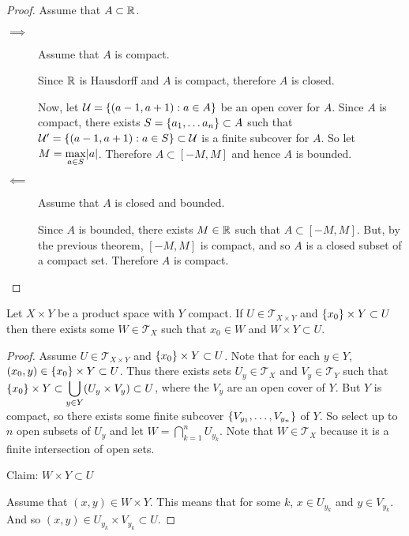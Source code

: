 \documentclass[letterpaper,12pt,fleqn]{article}
\newcommand{\T}{\mathscr{T}}
\newcommand{\U}{\mathcal{U}}
\begin{document}
\begin{proof}
  Assume that \(A\subset\mathbb{R}\).
  \begin{description}
  \item[\(\implies\)] Assume that \(A\) is compact.

    Since \(\mathbb{R}\) is Hausdorff and \(A\) is compact, therefore \(A\) is closed.

    Now, let \(\U=\set{(a-1,a+1):a\in A}\) be an open cover for \(A\).  Since \(A\) is compact, there exists
    \(S=\{a_1,\ldots a_n\}\subset A\) such that \(\U'=\set{(a-1,a+1):a\in S}\subset\U\) is a finite subcover for
    \(A\).  So let \(\displaystyle M=\max_{a\in S}\lvert a\rvert\).  Therefore \(A\subset[-M,M]\) and hence \(A\) is bounded.

  \item[\(\impliedby\)] Assume that \(A\) is closed and bounded.

    Since \(A\) is bounded, there exists \(M\in\mathbb{R}\) such that \(A\subset[-M,M]\).  But, by the previous theorem,
    \([-M,M]\) is compact, and so \(A\) is a closed subset of a compact set.  Therefore \(A\) is compact.
  \end{description}
\end{proof}

\begin{theorem}
  Let \(X\times Y\) be a product space with \(Y\) compact.  If \(U\in\T_{X\times Y}\) and
  \(\{x_0\}\times Y\subset U\) then there exists some \(W\in\T_X\) such that \(x_0\in W\) and
  \(W\times Y\subset U\).
\end{theorem}

\begin{proof}
  Assume \(U\in\T_{X\times Y}\) and \(\{x_0\}\times Y\subset U\).  Note that for each \(y\in Y\),
  \((x_0,y)\in\{x_0\}\times Y\subset U\).  Thus there exists sets \(U_y\in\T_X\) and \(V_y\in\T_Y\) such that
  \(\displaystyle\{x_0\}\times Y\subset\bigcup_{y\in Y}(U_y\times V_y)\subset U\), where the \(V_y\) are an open
  cover of \(Y\).  But \(Y\) is compact, so there exists some finite subcover \(\{V_{y_1},\ldots,V_{y_n}\}\) of
  \(Y\).  So select up to \(n\) open subsets of \(U_y\) and let \(\displaystyle W=\bigcap_{k=1}^nU_{y_k}\).  Note
  that \(W\in\T_X\) because it is a finite intersection of open sets.

  Claim: \(W\times Y\subset U\)

  Assume that \((x,y)\in W\times Y\).  This means that for some \(k\), \(x\in U_{y_k}\) and \(y\in V_{y_k}\).  And so
  \((x,y)\in U_{y_k}\times V_{y_k}\subset U\).
\end{proof}
\end{document}
